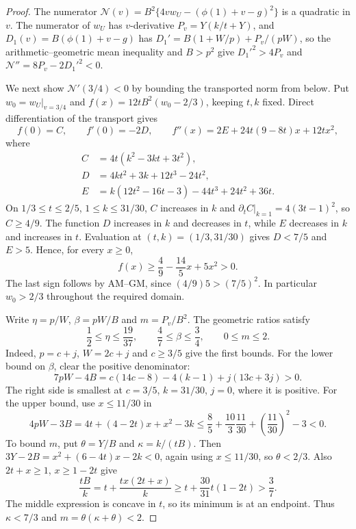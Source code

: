 \begin{proof}
The numerator $\mathcal N(v)=B^2\{4vw_U-(\phi(1)+v-g)^2\}$ is a quadratic in $v$. The numerator of
$w_U$ has $v$-derivative $P_v=Y(k/t+Y)$, and $D_1(v)=B(\phi(1)+v-g)$ has $D_1'=B(1+W/p)+P_v/(pW)$,
so the arithmetic--geometric mean inequality and $B>p^2$ give $D_1'^2>4P_v$ and
$\mathcal N''=8P_v-2D_1'^2<0$.

We next show $\mathcal N'(3/4)<0$ by bounding the transported norm from below.
Put $w_0=w_U|_{v=3/4}$ and $f(x)=12tB^2(w_0-2/3)$, keeping $t,k$ fixed.
Direct differentiation of the transport gives
\[
 f(0)=C,\qquad f'(0)=-2D,\qquad
 f''(x)=2E+24t(9-8t)x+12tx^2,
\]
where
\[
 \begin{split}
 C&=4t(k^2-3kt+3t^2),\\
 D&=4kt^2+3k+12t^3-24t^2,\\
 E&=k(12t^2-16t-3)-44t^3+24t^2+36t.
 \end{split}
\]
On $1/3\le t\le2/5$, $1\le k\le31/30$, $C$ increases in $k$ and
$\partial_tC|_{k=1}=4(3t-1)^2$, so $C\ge4/9$.
The function $D$ increases in $k$ and decreases in $t$, while $E$ decreases
in $k$ and increases in $t$. Evaluation at $(t,k)=(1/3,31/30)$ gives
$D<7/5$ and $E>5$. Hence, for every $x\ge0$,
\[
 f(x)\ge\frac49-\frac{14}5x+5x^2>0.
\]
The last sign follows by AM--GM, since $(4/9)5>(7/5)^2$.
In particular $w_0>2/3$ throughout the required domain.

Write $\eta=p/W$, $\beta=pW/B$ and $m=P_v/B^2$. The geometric ratios satisfy
\[
 \frac12\le\eta\le\frac{19}{37},\qquad
 \frac47\le\beta\le\frac34,\qquad 0\le m\le2.
\]
Indeed, $p=c+j$, $W=2c+j$ and $c\ge3/5$ give the first bounds.
For the lower bound on $\beta$, clear the positive denominator:
\[
 7pW-4B=c(14c-8)-4(k-1)+j(13c+3j)>0.
\]
The right side is smallest at $c=3/5$, $k=31/30$, $j=0$, where it is positive.
For the upper bound, use
$x\le11/30$ in
\[
 4pW-3B=4t+(4-2t)x+x^2-3k
 \le\frac85+\frac{10}3\frac{11}{30}+\left(\frac{11}{30}\right)^2-3<0.
\]
To bound $m$, put $\theta=Y/B$ and $\kappa=k/(tB)$.
Then $3Y-2B=x^2+(6-4t)x-2k<0$, again using $x\le11/30$,
so $\theta<2/3$. Also $2t+x\ge1$, $x\ge1-2t$ give
\[
 \frac{tB}{k}=t+\frac{tx(2t+x)}k
 \ge t+\frac{30}{31}t(1-2t)>\frac37.
\]
The middle expression is concave in $t$, so its minimum is at an endpoint.
Thus $\kappa<7/3$ and $m=\theta(\kappa+\theta)<2$.


\end{proof}
